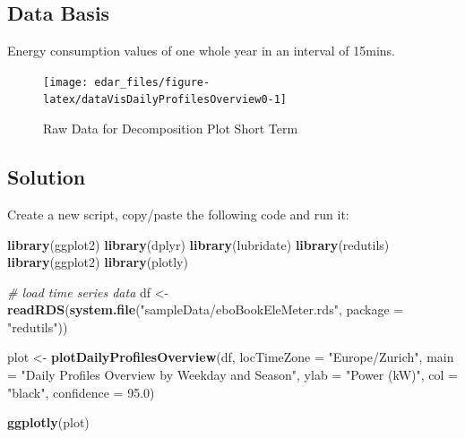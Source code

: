 \documentclass[
  a4paperpaper,
]{book}
\newenvironment{Shaded}{\begin{snugshade}}{\end{snugshade}}
\newcommand{\CommentTok}[1]{\textcolor[rgb]{0.56,0.35,0.01}{\textit{#1}}}
\newcommand{\DataTypeTok}[1]{\textcolor[rgb]{0.13,0.29,0.53}{#1}}
\newcommand{\FloatTok}[1]{\textcolor[rgb]{0.00,0.00,0.81}{#1}}
\newcommand{\KeywordTok}[1]{\textcolor[rgb]{0.13,0.29,0.53}{\textbf{#1}}}
\newcommand{\NormalTok}[1]{#1}
\newcommand{\StringTok}[1]{\textcolor[rgb]{0.31,0.60,0.02}{#1}}
\let\oldShaded\Shaded
\let\endoldShaded\endShaded
\renewenvironment{Shaded}{\footnotesize\oldShaded}{\endoldShaded}
\begin{document}
\hypertarget{data-basis-8}{%
\subsection{Data Basis}\label{data-basis-8}}

Energy consumption values of one whole year in an interval of 15mins.

\begin{figure}
\texttt{[image: edar\_files/figure-latex/dataVisDailyProfilesOverview0-1]} \caption{Raw Data for Decomposition Plot Short Term}\label{fig:dataVisDailyProfilesOverview0}
\end{figure}

\newpage

\hypertarget{solution-8}{%
\subsection{Solution}\label{solution-8}}

Create a new script, copy/paste the following code and run it:

\begin{Shaded}
\begin{Highlighting}[]
\KeywordTok{library}\NormalTok{(ggplot2)}
\KeywordTok{library}\NormalTok{(dplyr)}
\KeywordTok{library}\NormalTok{(lubridate)}
\KeywordTok{library}\NormalTok{(redutils)}
\KeywordTok{library}\NormalTok{(ggplot2)}
\KeywordTok{library}\NormalTok{(plotly)}

\CommentTok{# load time series data}
\NormalTok{df <-}\StringTok{ }\KeywordTok{readRDS}\NormalTok{(}\KeywordTok{system.file}\NormalTok{(}\StringTok{"sampleData/eboBookEleMeter.rds"}\NormalTok{, }\DataTypeTok{package =} \StringTok{"redutils"}\NormalTok{))}

\NormalTok{plot <-}\StringTok{ }\KeywordTok{plotDailyProfilesOverview}\NormalTok{(df,}
                               \DataTypeTok{locTimeZone =} \StringTok{"Europe/Zurich"}\NormalTok{,}
                               \DataTypeTok{main =} \StringTok{"Daily Profiles Overview by Weekday and Season"}\NormalTok{,}
                               \DataTypeTok{ylab =} \StringTok{"Power (kW)"}\NormalTok{,}
                               \DataTypeTok{col =} \StringTok{"black"}\NormalTok{,}
                               \DataTypeTok{confidence =} \FloatTok{95.0}\NormalTok{)}

\KeywordTok{ggplotly}\NormalTok{(plot)}
\end{Highlighting}
\end{Shaded}
\end{document}

